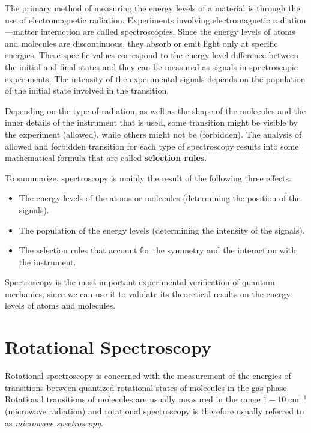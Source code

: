 \documentclass[
  9pt,
]{extbook}
\providecommand{\tightlist}{%
  \setlength{\itemsep}{0pt}\setlength{\parskip}{0pt}}
\theoremstyle{definition}
\theoremstyle{definition}
\theoremstyle{definition}
\theoremstyle{remark}
\begin{document}
The primary method of measuring the energy levels of a material is through the use of electromagnetic radiation. Experiments involving electromagnetic radiation---matter interaction are called spectroscopies. Since the energy levels of atoms and molecules are discontinuous, they absorb or emit light only at specific energies. These specific values correspond to the energy level difference between the initial and final states and they can be measured as signals in spectroscopic experiments. The intensity of the experimental signals depends on the population of the initial state involved in the transition.

Depending on the type of radiation, as well as the shape of the molecules and the inner details of the instrument that is used, some transition might be visible by the experiment (allowed), while others might not be (forbidden). The analysis of allowed and forbidden transition for each type of spectroscopy results into some mathematical formula that are called \textbf{selection rules}.

To summarize, spectroscopy is mainly the result of the following three effects:

\begin{itemize}
\tightlist
\item
  The energy levels of the atoms or molecules (determining the position of the signals).
\item
  The population of the energy levels (determining the intensity of the signals).
\item
  The selection rules that account for the symmetry and the interaction with the instrument.
\end{itemize}

Spectroscopy is the most important experimental verification of quantum mechanics, since we can use it to validate its theoretical results on the energy levels of atoms and molecules.

\hypertarget{rotational-spectroscopy}{%
\section{Rotational Spectroscopy}\label{rotational-spectroscopy}}

Rotational spectroscopy is concerned with the measurement of the energies of transitions between quantized rotational states of molecules in the gas phase. Rotational transitions of molecules are usually measured in the range \(1-10\; \text{cm}^{-1}\) (microwave radiation) and rotational spectroscopy is therefore usually referred to as \emph{microwave spectroscopy}.
\end{document}
